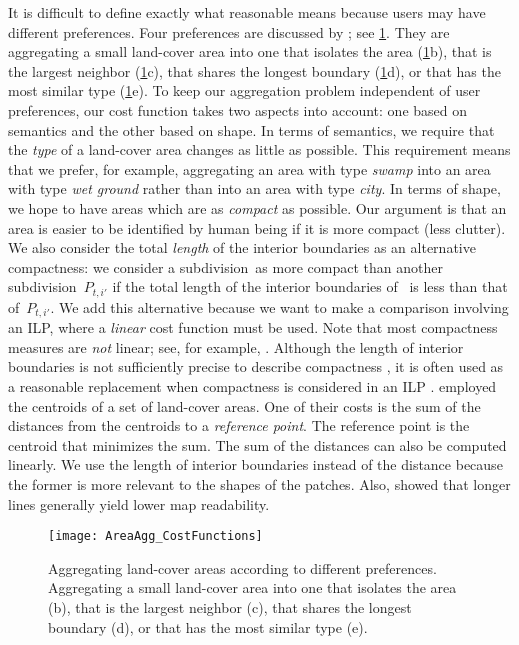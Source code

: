 It is difficult to define exactly what reasonable means 
because users may have different preferences.
Four preferences are discussed by
\textcite{Cheng2006}; see \fig\ref{fig:AreaAgg_Preferences}.
They are aggregating a small land-cover area into one 
that isolates the area 
(\fig\ref{fig:AreaAgg_Preferences}b), 
that is the largest neighbor 
(\fig\ref{fig:AreaAgg_Preferences}c), 
that shares the longest boundary 
(\fig\ref{fig:AreaAgg_Preferences}d), or 
that has the most similar type
(\fig\ref{fig:AreaAgg_Preferences}e).
To keep our aggregation problem independent of user preferences,
our cost function takes two aspects into account: 
one based on semantics and 
the other based on shape.
%
In terms of semantics, we require that 
the \emph{type} of a land-cover area changes 
as little as possible.
This requirement means that we prefer, for example, 
aggregating an area with type \emph{swamp} 
into an area with type \emph{wet ground} 
rather than into an area with type \emph{city}.
%
In terms of shape, we hope to have areas 
which are as \emph{compact} as possible.
Our argument is that an area is easier 
to be identified by human being 
if it is more compact (less clutter).
%
We also consider the total \emph{length} 
of the interior boundaries as an alternative compactness:
we consider a subdivision~\Pnode as more compact than
another subdivision~$P_{t,i'}$ 
if the total length of the interior boundaries of~\Pnode 
is less than that of~$P_{t,i'}$.
We add this alternative because we want to make a comparison 
involving an ILP, 
where a \emph{linear} cost function must be used.
Note that most compactness measures
are \emph{not} linear;
see, for example, \textcite{Maceachren1985,Li2013Compactness}.
Although the length of interior boundaries 
is not sufficiently precise 
to describe compactness \parencite{Young1988},
it is often used as a reasonable replacement
when compactness is considered in an ILP
\parencite[e.g.,][]{Minas2016,Wright1983}.
\textcite{HaunertWolff2010AreaAgg} employed 
the centroids of a set of land-cover areas.
One of their costs is the sum of the distances 
from the centroids to a \emph{reference point}.
The reference point is the centroid
that minimizes the sum.
The sum of the distances can also be computed linearly.
We use the length of interior boundaries 
instead of the distance because the former 
is more relevant to the shapes of the patches.
Also, \textcite{Harrie2015Readability} showed that
longer lines generally yield lower map readability.

\begin{figure}[tb]
\centering
\texttt{[image: AreaAgg\_CostFunctions]}
\caption{Aggregating land-cover areas 
	according to different preferences.
	Aggregating a small land-cover area into one 
	that isolates the area (b), 
	that is the largest neighbor (c), 
	that shares the longest boundary (d), or 
	that has the most similar type (e).}
\label{fig:AreaAgg_Preferences}	
\end{figure}


